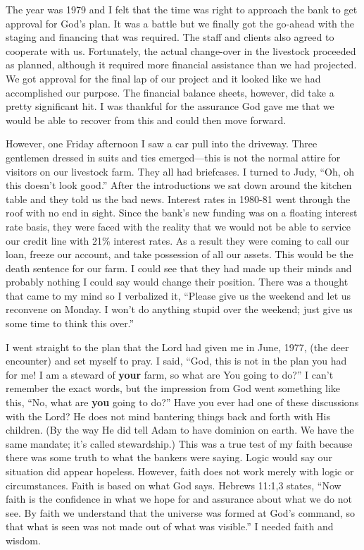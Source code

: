 \documentclass[twoside, 12pt]{book}
\begin{document}
The year was 1979 and I felt that the time was right to approach the bank to get approval for God’s plan. It was a battle but we finally got the go-ahead with the staging and financing that was required. The staff and clients also agreed to cooperate with us. Fortunately, the actual change-over in the livestock proceeded as planned, although it required more financial assistance than we had projected. We got approval for the final lap of our project and it looked like we had accomplished our purpose. The financial balance sheets, however, did take a pretty significant hit. I was thankful for the assurance God gave me that we would be able to recover from this and could then move forward. 

However, one Friday afternoon I saw a car pull into the driveway. Three gentlemen dressed in suits and ties emerged—this is not the normal attire for visitors on our livestock farm. They all had briefcases. I turned to Judy, “Oh, oh this doesn't look good.” After the introductions we sat down around the kitchen table and they told us the bad news. Interest rates in 1980-81 went through the roof with no end in sight. Since the bank's new funding was on a floating interest rate basis, they were faced with the reality that we would not be able to service our credit line with 21\% interest rates. As a result they were coming to call our loan, freeze our account, and take possession of all our assets. This would be the death sentence for our farm. I could see that they had made up their minds and probably nothing I could say would change their position. There was a thought that came to my mind so I verbalized it, “Please give us the weekend and let us reconvene on Monday. I won't do anything stupid over the weekend; just give us some time to think this over.”

I went straight to the plan that the Lord had given me in June, 1977, (the deer encounter) and set myself to pray. I said, “God, this is not in the plan you had for me!  I am a steward of \textbf{your} farm, so what are You going to do?” I can't remember the exact words, but the impression from God went something like this, “No, what are \textbf{you} going to do?” Have you ever had one of these discussions with the Lord? He does not mind bantering things back and forth with His children. (By the way He did tell Adam to have dominion on earth. We have the same mandate; it’s called stewardship.) This was a true test of my faith because there was some truth to what the bankers were saying. Logic would say our situation did appear hopeless. However, faith does not work merely with logic or circumstances. Faith is based on what God says. Hebrews 11:1,3 states, “Now faith is the confidence in what we hope for and assurance about what we do not see. By faith we understand that the universe was formed at God’s command, so that what is seen was not made out of what was visible.” I needed faith and wisdom. 
\end{document}
